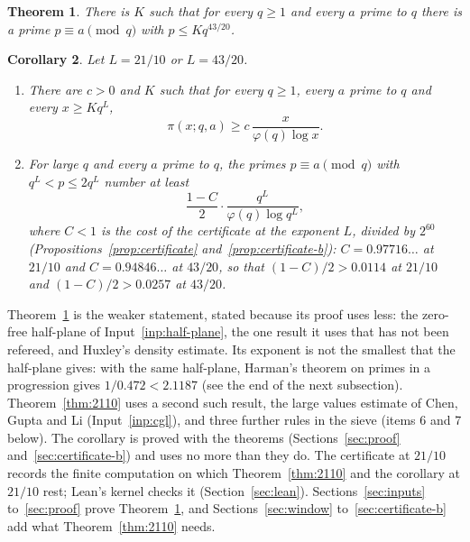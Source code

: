 \documentclass[11pt]{article}
\newtheorem{theorem}{Theorem}[section]
\newtheorem{corollary}[theorem]{Corollary}
\theoremstyle{definition}
\begin{document}
\begin{theorem}\label{thm:4320}
There is $K$ such that for every $q \ge 1$ and every $a$ prime to $q$ there is a prime $p \equiv a \pmod q$ with
$p \le K q^{43/20}$.
\end{theorem}

\begin{corollary}\label{cor:count}
Let $L = 21/10$ or $L = 43/20$.
\begin{enumerate}
\item[(a)] There are $c > 0$ and $K$ such that for every $q \ge 1$, every $a$ prime to $q$ and every $x \ge Kq^L$,
  \[
    \pi(x; q, a) \ge c\, \frac{x}{\varphi(q) \log x}.
  \]
\item[(b)] For large $q$ and every $a$ prime to $q$, the primes $p \equiv a \pmod q$ with $q^L < p \le 2q^L$ number
  at least
  \[
    \frac{1 - C}2 \cdot \frac{q^L}{\varphi(q) \log q^L},
  \]
  where $C < 1$ is the cost of the certificate at the exponent $L$, divided by $2^{60}$
  (Propositions~\ref{prop:certificate} and~\ref{prop:certificate-b}): $C = 0.97716\ldots$ at $21/10$ and
  $C = 0.94846\ldots$ at $43/20$, so that $(1 - C)/2 > 0.0114$ at $21/10$ and $(1 - C)/2 > 0.0257$ at $43/20$.
\end{enumerate}
\end{corollary}

Theorem~\ref{thm:4320} is the weaker statement, stated because its proof uses less: the zero-free half-plane of
Input~\ref{inp:half-plane}, the one result it uses that has not been refereed, and Huxley's density estimate. Its
exponent is not the smallest that the half-plane gives: with the same half-plane, Harman's theorem on primes in a
progression \cite{harman05} gives $1/0.472 < 2.1187$ (see the end of the next subsection).
Theorem~\ref{thm:2110} uses a second such result, the large values estimate of Chen, Gupta and Li (Input~\ref{inp:cgl}),
and three further rules in the sieve (items 6 and 7 below). The corollary is proved with the theorems
(Sections~\ref{sec:proof} and~\ref{sec:certificate-b}) and uses no more than they do. The certificate at $21/10$
records the finite computation on which Theorem~\ref{thm:2110} and the corollary at $21/10$ rest; Lean's kernel
checks it (Section~\ref{sec:lean}). Sections~\ref{sec:inputs}
to~\ref{sec:proof} prove Theorem~\ref{thm:4320}, and Sections~\ref{sec:window} to~\ref{sec:certificate-b} add what
Theorem~\ref{thm:2110} needs.
\end{document}
